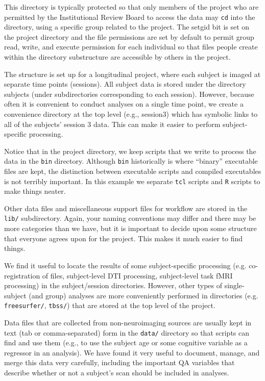 This directory is typically protected so that only members of the project who are permitted by the Institutional Review Board to access the data may \texttt{cd} into the directory, using a specific group related to the project. The setgid bit  is set on the project directory and the file permissions are set by default to permit group read, write, and execute permission for each individual so that files people create within the directory substructure are accessible by others in the project. 


The structure is set up for a longitudinal project, where each subject is imaged at separate time points (sessions). All subject data is stored under the directory subjects (under subdirectories corresponding to each session). However, because often it is convenient to conduct analyses on a single time point, we create a convenience directory at the top level (e.g., session3) which has symbolic links to all of the subjects' session 3 data. This can make it easier to perform subject-specific processing.

Notice that in the project directory, we keep scripts that we write to process the data in the \texttt{bin} directory. Although \texttt{bin} historically is where ``binary'' executable files are kept, the distinction between executable \bashn{} scripts and compiled executables is not terribly important. In this example we separate \texttt{tcl} scripts and \texttt{R} scripts to make things neater. 

Other data files and miscellaneous support files for workflow are stored in the \texttt{lib/} subdirectory. Again, your naming conventions may differ and there may be more categories than we have, but it is important to decide upon some structure that everyone agrees upon for the project. This makes it much easier to find things.

We find it useful to locate the results of some subject-specific processing (e.g. co-registration of files, subject-level DTI processing, subject-level task fMRI processing) in the subject/session directories. However, other types of single-subject (and group) analyses are more conveniently performed in directories (e.g. \texttt{freesurfer/}, \texttt{tbss/}) that are stored at the top level of the project.

Data files that are collected from non-neuroimaging sources are usually kept in text (tab or comma-separated) form in the \texttt{data/} directory so that scripts can find and use them (e.g., to use the subject age or some cognitive variable as a regressor in an analysis). We have found it very useful to document, manage, and merge this data very carefully, including the important QA variables that describe whether or not a subject's scan should be included in analyses.


